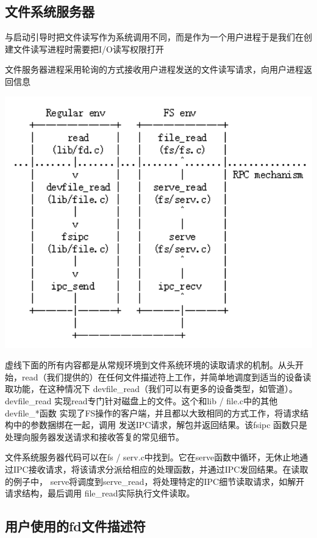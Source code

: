 \subsection{文件系统服务器}

与启动引导时把文件读写作为系统调用不同，而是作为一个用户进程于是我们在创建文件读写进程时需要把I/O读写权限打开

文件服务器进程采用轮询的方式接收用户进程发送的文件读写请求，向用户进程返回信息

\includegraphics[width=6in]{figures/file/fig4.png}

虚线下面的所有内容都是从常规环境到文件系统环境的读取请求的机制。从头开始，read（我们提供的）在任何文件描述符上工作，并简单地调度到适当的设备读取功能，在这种情况下 devfile\_read（我们可以有更多的设备类型，如管道）。 devfile\_read 实现read专门针对磁盘上的文件。这个和lib / file.c中的其他devfile\_*函数 实现了FS操作的客户端，并且都以大致相同的方式工作，将请求结构中的参数捆绑在一起，调用 发送IPC请求，解包并返回结果。该fsipc 函数只是处理向服务器发送请求和接收答复的常见细节。

文件系统服务器代码可以在fs / serv.c中找到。它在serve函数中循环，无休止地通过IPC接收请求，将该请求分派给相应的处理函数，并通过IPC发回结果。在读取的例子中， serve将调度到serve\_read，将处理特定的IPC细节读取请求，如解开请求结构，最后调用 file\_read实际执行文件读取。

\subsection{用户使用的fd文件描述符}

